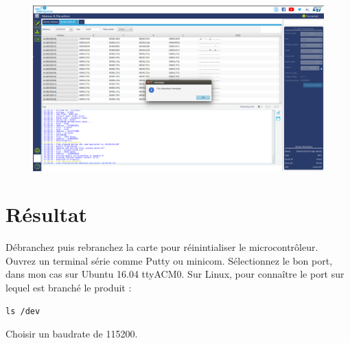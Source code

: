 \documentclass{article}
\begin{document}
\begin{figure}[H]
\begin{center}
\advance\leftskip-3cm
\advance\rightskip-3cm
\includegraphics[keepaspectratio=true,scale=0.3]{downloaded.png}

\label{visina8}
\end{center}\end{figure}



\section{Résultat}

Débranchez puis rebranchez la carte pour réinintialiser le microcontrôleur.\\
Ouvrez un terminal série comme Putty ou minicom.
Sélectionnez le bon port, dans mon cas sur Ubuntu 16.04 ttyACM0.
Sur Linux, pour connaître le port sur lequel est branché le produit :

\begin{verbatim}
ls /dev

\end{verbatim}

Choisir un baudrate de 115200.
\end{document}

